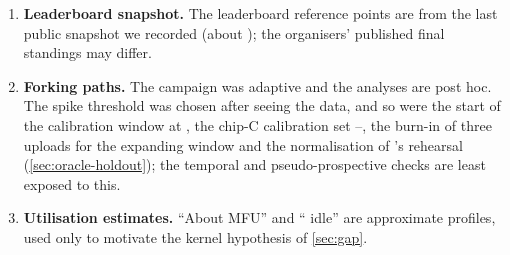 \begin{enumerate}
    upper bound.
  \item \textbf{Leaderboard snapshot.} The leaderboard reference points are from the last public snapshot we recorded (about
    \docnum{}); the organisers' published final standings may differ.
  \item \textbf{Forking paths.} The campaign was adaptive and the analyses are post hoc. The spike threshold was
    chosen after seeing the data, and so were the start of the calibration window at , the chip-C
    calibration set --, the burn-in of three uploads for the expanding window and the normalisation
    of 's rehearsal (\cref{sec:oracle-holdout}); the temporal and pseudo-prospective checks are least exposed
    to this.
  \item \textbf{Utilisation estimates.} ``About \docnum{} MFU'' and ``\docnum{} idle'' are
    approximate profiles, used only to motivate the kernel hypothesis of \cref{sec:gap}.
\end{enumerate}
